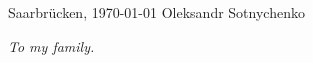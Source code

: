 \documentclass[11pt, a4paper, twoside]{Thesis}
\newcommand{\listofalgorithmes}{\tocfile{\listalgorithmcfname}{loa}}
\begin{document}
\begin{flushright}
\noindent Saarbr\"{u}cken, \today
\hfill
Oleksandr Sotnychenko
\end{flushright}

\clearpage  %

\newpage
\mbox{}
\thispagestyle{empty}
\newpage

\clearpage
\newpage
\mbox{}
\thispagestyle{empty}
\newpage


\clearpage  %
\newpage
\mbox{}
\thispagestyle{empty}
\newpage

\thispagestyle{empty}
\emph{To my family.}
\clearpage

\newpage
\mbox{}
\thispagestyle{empty}
\newpage

\begin{spacing}{0.1}
\pagestyle{fancy}
\tableofcontents
\newpage
\listoffigures
\newpage
\end{spacing}

\clearpage

\mainmatter


\clearpage



\clearpage


\clearpage


\clearpage


\clearpage


\clearpage


\clearpage


\clearpage



{\small}
\clearpage



%
\end{document}
